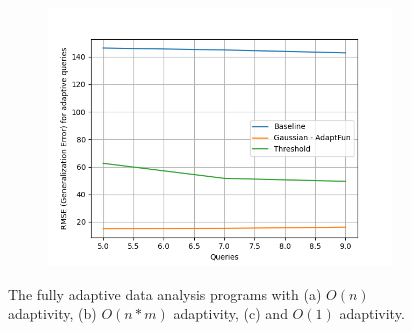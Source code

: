 {\begin{figure}
\begin{subfigure}{.322\textwidth}
\begin{centering}
\includegraphics[width=1.0\textwidth]{n_adaptivity.png}
\caption{}
\end{centering}
\end{subfigure}
\vspace{-0.2cm}
 \caption{The fully adaptive data analysis programs with
 (a) $O(n)$ adaptivity, 
 (b) $O(n*m)$ adaptivity,
 (c) and $O(1)$ adaptivity.
}
\label{fig:implementation_generalization_errors}
\vspace{-0.6cm}
\end{figure}
}
